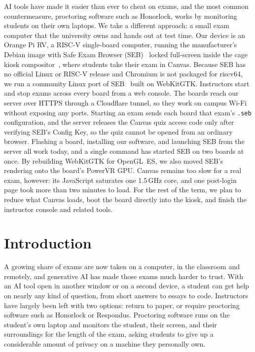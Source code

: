 \documentclass[11pt]{article}
\begin{document}
AI tools have made it easier than ever to cheat on exams, and the most common countermeasure, proctoring software such as Honorlock, works by monitoring students on their own laptops. We take a different approach: a small exam computer that the university owns and hands out at test time. Our device is an Orange Pi RV, a RISC-V single-board computer, running the manufacturer's Debian image with Safe Exam Browser (SEB)~\cite{safeexambrowser} locked full-screen inside the cage kiosk compositor~\cite{cage_kiosk}, where students take their exam in Canvas. Because SEB has no official Linux or RISC-V release and Chromium is not packaged for riscv64, we run a community Linux port of SEB~\cite{seblinux} built on WebKitGTK. Instructors start and stop exams across every board from a web console. The boards reach our server over HTTPS through a Cloudflare tunnel, so they work on campus Wi-Fi without exposing any ports. Starting an exam sends each board that exam's \texttt{.seb} configuration, and the server releases the Canvas quiz access code only after verifying SEB's Config Key, so the quiz cannot be opened from an ordinary browser. Flashing a board, installing our software, and launching SEB from the server all work today, and a single command has started SEB on two boards at once. By rebuilding WebKitGTK for OpenGL~ES, we also moved SEB's rendering onto the board's PowerVR GPU. Canvas remains too slow for a real exam, however: its JavaScript saturates one 1.5\,GHz core, and one post-login page took more than two minutes to load. For the rest of the term, we plan to reduce what Canvas loads, boot the board directly into the kiosk, and finish the instructor console and related tools.

\section{Introduction}
A growing share of exams are now taken on a computer, in the classroom and remotely, and generative AI has made those exams much harder to trust. With an AI tool open in another window or on a second device, a student can get help on nearly any kind of question, from short answers to essays to code. Instructors have largely been left with two options: return to paper, or require proctoring software such as Honorlock or Respondus. Proctoring software runs on the student's own laptop and monitors the student, their screen, and their surroundings for the length of the exam, asking students to give up a considerable amount of privacy on a machine they personally own.
\end{document}
